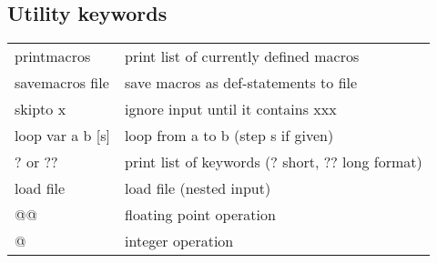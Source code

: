 \documentclass[a4paper]{article}
\begin{document}
\subsection{Utility keywords}

\begin{tabular}{ll}
printmacros     & print list of currently defined macros \\
savemacros file & save macros as def-statements to file  \\
skipto x        & ignore input until it contains xxx     \\
loop var a b [s]& loop from a to b (step s if given)     \\
? or ?? & print list of keywords (? short, ?? long format)\\
load  file      & load file (nested input) \\
  @@            & floating point operation\\
  @             & integer operation 
\end{tabular}
\end{document}
